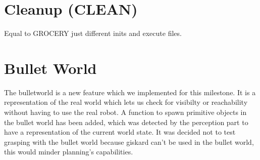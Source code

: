\documentclass[main.tex]{subfiles}
\begin{document}
                \section{Cleanup (CLEAN)}
                Equal to GROCERY just different inits and execute files.
                \section{Bullet World}
                The bulletworld is a new feature which we implemented for this milestone. It is a representation of the real world which lets us check for visibilty or reachability without having to use the real robot. A function to spawn primitive objects in the bullet world has been added, which was detected by the perception part to have a representation of the current world state. It was decided not to test grasping with the bullet world because giskard can't be used in the bullet world, this would minder planning's capabilities. 
                
\end{document}
